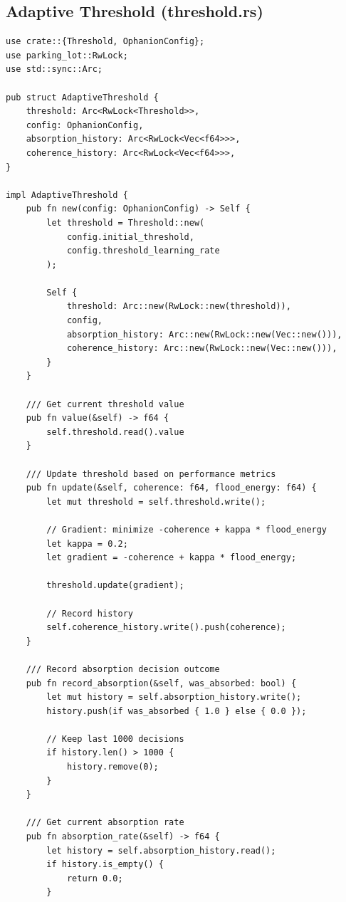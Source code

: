\documentclass[11pt,a4paper]{article}
\begin{document}
\subsection{Adaptive Threshold (threshold.rs)}

\begin{lstlisting}[style=rust]
use crate::{Threshold, OphanionConfig};
use parking_lot::RwLock;
use std::sync::Arc;

pub struct AdaptiveThreshold {
    threshold: Arc<RwLock<Threshold>>,
    config: OphanionConfig,
    absorption_history: Arc<RwLock<Vec<f64>>>,
    coherence_history: Arc<RwLock<Vec<f64>>>,
}

impl AdaptiveThreshold {
    pub fn new(config: OphanionConfig) -> Self {
        let threshold = Threshold::new(
            config.initial_threshold, 
            config.threshold_learning_rate
        );
        
        Self {
            threshold: Arc::new(RwLock::new(threshold)),
            config,
            absorption_history: Arc::new(RwLock::new(Vec::new())),
            coherence_history: Arc::new(RwLock::new(Vec::new())),
        }
    }
    
    /// Get current threshold value
    pub fn value(&self) -> f64 {
        self.threshold.read().value
    }
    
    /// Update threshold based on performance metrics
    pub fn update(&self, coherence: f64, flood_energy: f64) {
        let mut threshold = self.threshold.write();
        
        // Gradient: minimize -coherence + kappa * flood_energy
        let kappa = 0.2;
        let gradient = -coherence + kappa * flood_energy;
        
        threshold.update(gradient);
        
        // Record history
        self.coherence_history.write().push(coherence);
    }
    
    /// Record absorption decision outcome
    pub fn record_absorption(&self, was_absorbed: bool) {
        let mut history = self.absorption_history.write();
        history.push(if was_absorbed { 1.0 } else { 0.0 });
        
        // Keep last 1000 decisions
        if history.len() > 1000 {
            history.remove(0);
        }
    }
    
    /// Get current absorption rate
    pub fn absorption_rate(&self) -> f64 {
        let history = self.absorption_history.read();
        if history.is_empty() {
            return 0.0;
        }
        

\end{lstlisting}
\end{document}
